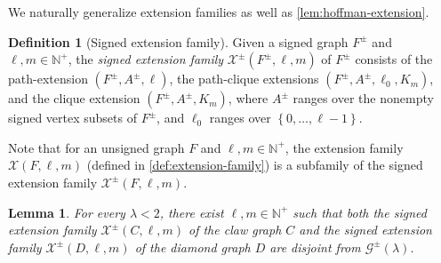 \documentclass[11pt]{article}
\newtheorem{lemma}[theorem]{Lemma}
\theoremstyle{definition}
\newtheorem{definition}[theorem]{Definition}
\theoremstyle{remark}
\newcommand{\sset}[1]{\left\{{#1}\right\}}
\newcommand{\la}{\lambda}
\newcommand{\G}{\mathcal{G}}
\newcommand{\N}{\mathbb{N}}
\newcommand{\X}{\mathcal{X}}
\newcommand{\Gs}{\G^\pm(\la)}
\begin{document}
We naturally generalize extension families as well as \cref{lem:hoffman-extension}.

\begin{definition}[Signed extension family]
    Given a signed graph $F^\pm$ and $\ell, m \in \N^+$, the \emph{signed extension family} $\X^\pm(F^\pm, \ell, m)$ of $F^\pm$ consists of the path-extension $(F^\pm, A^\pm, \ell)$, the path-clique extensions $(F^\pm, A^\pm, \ell_0, K_m)$, and the clique extension $(F^\pm, A^\pm, K_m)$, where $A^\pm$ ranges over the nonempty signed vertex subsets of $F^\pm$, and $\ell_0$ ranges over $\sset{0, \dots, \ell-1}$.
\end{definition}

Note that for an unsigned graph $F$ and $\ell, m \in \N^+$, the extension family $\X(F, \ell, m)$ (defined in \cref{def:extension-family}) is a subfamily of the signed extension family $\X^\pm(F, \ell, m)$.

\begin{lemma} \label{lem:hoffman-extension-signed}
    For every $\la < 2$, there exist $\ell, m \in \N^+$ such that both the signed extension family $\X^\pm(C, \ell, m)$ of the claw graph $C$ and the signed extension family $\X^\pm(D, \ell, m)$ of the diamond graph $D$ are disjoint from $\Gs$.
\end{lemma}
\end{document}
